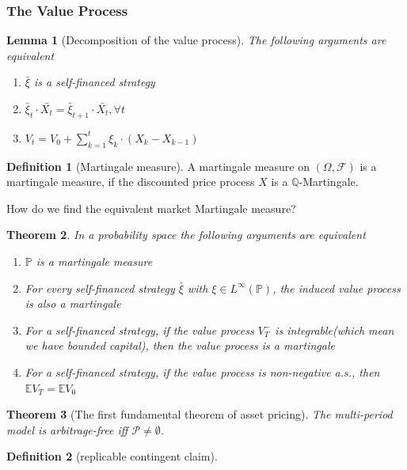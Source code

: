 \documentclass[a4paper,11pt]{book}
\newtheorem{theorem}{Theorem}[section]
\newtheorem{lemma}[theorem]{Lemma}
\theoremstyle{definition}
\newtheorem{definition}{Definition}[section]
\theoremstyle{remark}
\begin{document}
\subsubsection*{The Value Process}


\begin{lemma}[Decomposition of the value process]
	The following arguments are equivalent
	\begin{enumerate}
		\item $\bar{\xi}$ is a self-financed strategy
		\item $\bar{\xi}_t \cdot \bar{X_t} = \bar{\xi}_{t + 1} \cdot \bar{X_t}, \forall t$
		\item $V_t = V_0 + \sum_{k = 1}^t \xi_k \cdot (X_k - X_{k - 1})$
	\end{enumerate}
\end{lemma}

\begin{definition}[Martingale measure]
	A martingale measure on $(\Omega, \mathcal{F})$ is a martingale measure, if the discounted price process $X$ is a $\mathbb{Q}$-Martingale.  
\end{definition}

How do we find the equivalent market Martingale measure?

\begin{theorem}
	In a probability space the following arguments are equivalent
	\begin{enumerate}
		\item $\mathbb{P}$ is a martingale measure
		\item For every self-financed strategy $\bar{\xi}$ with $\xi \in L^\infty(\mathbb{P})$, the induced value process is also a martingale
		\item For a self-financed strategy, if the value process $V^-_T$ is integrable(which mean we have bounded capital), then the value process is a martingale
		\item For a self-financed strategy, if the value process is non-negative a.s., then $\mathbb{E}V_T = \mathbb{E}V_0$
	\end{enumerate}
\end{theorem}

\begin{theorem}[The first fundamental theorem of asset pricing]
The multi-period model is arbitrage-free iff $\mathcal{P} \neq \emptyset$.
\end{theorem}
 
\begin{definition}[replicable contingent claim]
\end{definition}
\end{document}
